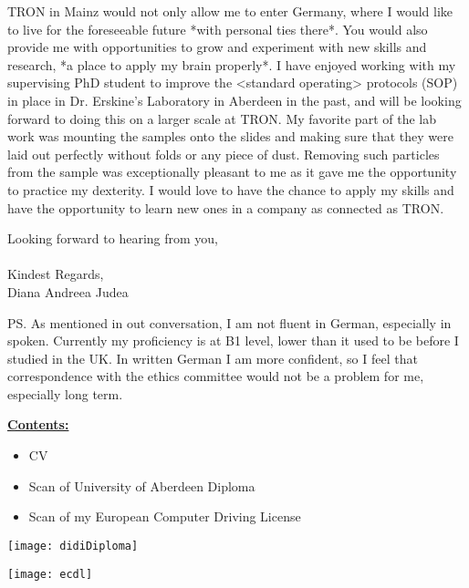 \documentclass[paper=a4,fontsize=11pt]{scrartcl} %
\newcommand{\sepspace}{\vspace*{1em}}		%
\begin{document}
  \noindent 
  TRON in Mainz would not only allow me to enter Germany, where I would like to
  live for the foreseeable future *with personal ties there*.  You would also
  provide me with opportunities to grow and experiment with new skills and
  research, *a place to apply my brain properly*.  I have enjoyed working with
  my supervising PhD student to improve the <standard operating> protocols
  (SOP) in place in Dr. Erskine's Laboratory in Aberdeen in the past, and will
  be looking forward to doing this on a larger scale at TRON.  My favorite part
  of the lab work was mounting the samples onto the slides and making sure that
  they were laid out perfectly without folds or any piece of dust.  Removing
  such particles from the sample was exceptionally pleasant to me as it gave me
  the opportunity to practice my dexterity.  I would love to have the chance to
  apply my skills and have the opportunity to learn new ones in a company as
  connected as TRON.
  \sepspace


  \noindent
  Looking forward to hearing from you, \\\\
  Kindest Regards,\\
  Diana Andreea Judea
  \sepspace

  \noindent
  PS. As mentioned in out conversation, I am not fluent in German, especially
  in spoken.  Currently my proficiency is at B1 level, lower than it used to be
  before I studied in the UK.  In written German I am more confident, so I feel
  that correspondence with the ethics committee would not be a problem for me,
  especially long term.
  \sepspace

  \vspace*{\fill}
  
  \textbf{\underline{Contents:}}
  \begin{itemize}[noitemsep,topsep=0pt]
    \setlength\itemsep{1pt}
    \item CV
    \item Scan of University of Aberdeen Diploma
    \item Scan of my European Computer Driving License
  \end{itemize}
  
  \cleardoublepage
  
  \texttt{[image: didiDiploma]}

  \cleardoublepage

  \texttt{[image: ecdl]}
  
\end{document}
